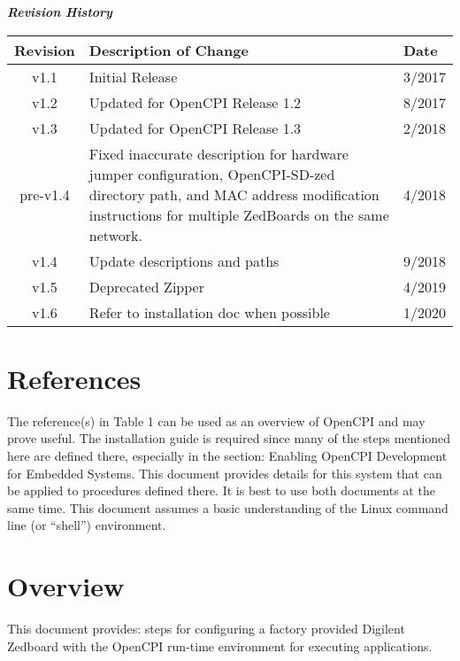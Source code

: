 \newpage

	\begin{center}
	\textit{\textbf{Revision History}}
		\begin{table}[H]
		\label{table:revisions} %
			\begin{tabularx}{\textwidth}{|c|X|l|}
			\hline
			\rowcolor{blue}
			\textbf{Revision} & \textbf{Description of Change} & \textbf{Date} \\
		    \hline
		    v1.1 & Initial Release & 3/2017 \\
				\hline
				v1.2 & Updated for OpenCPI Release 1.2 & 8/2017 \\
				\hline
				v1.3 & Updated for OpenCPI Release 1.3 & 2/2018 \\
				\hline
				pre-v1.4 & Fixed inaccurate description for hardware jumper configuration, OpenCPI-SD-zed directory path, and MAC address modification instructions for multiple ZedBoards on the same network. & 4/2018 \\
				\hline
				v1.4 & Update descriptions and paths & 9/2018 \\
				\hline
				v1.5 & Deprecated Zipper & 4/2019 \\
				\hline
                                v1.6 & Refer to installation doc when possible & 1/2020 \\
			        \hline
			\end{tabularx}
		\end{table}
	\end{center}

\newpage

\tableofcontents

\newpage

\section{References}
The reference(s) in Table 1 can be used as an overview of OpenCPI and may prove useful.  The installation guide is required since many of the steps mentioned here are defined there, especially in the section:  Enabling OpenCPI Development for Embedded Systems.  This document provides details for this system that can be applied to procedures defined there.  It is best to use both documents at the same time.  This document assumes a basic understanding of the Linux command line (or ``shell'') environment.  
\def\refcapbottom{}

\section{Overview}
This document provides: steps for configuring a factory provided Digilent Zedboard with the OpenCPI run-time environment for executing applications.

